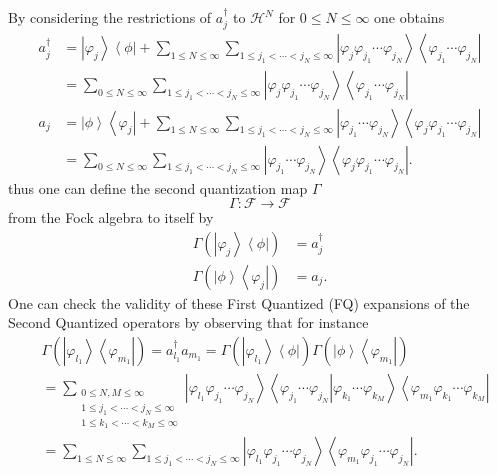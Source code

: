 \documentclass[aps,preprint]{revtex4}%
\begin{document}
\bigskip By considering the restrictions of $a_{j}^{\dagger}$ to
$\mathcal{H}^{N}$ for $0\leq N\leq\infty$ one obtains%
\begin{align}
a_{j}^{\dagger}  &  =\left\vert \varphi_{j}\right\rangle \left\langle
\phi\right\vert +\sum_{1\leq N\leq\infty}\sum_{1\leq j_{1}<\cdots<j_{N}%
\leq\infty}\left\vert \varphi_{j}\varphi_{j_{1}}\cdots\varphi_{j_{N}%
}\right\rangle \left\langle \varphi_{j_{1}}\cdots\varphi_{j_{N}}\right\vert
\nonumber\\
&  =\sum_{0\leq N\leq\infty}\sum_{1\leq j_{1}<\cdots<j_{N}\leq\infty
}\left\vert \varphi_{j}\varphi_{j_{1}}\cdots\varphi_{j_{N}}\right\rangle
\left\langle \varphi_{j_{1}}\cdots\varphi_{j_{N}}\right\vert \nonumber\\
a_{j}  &  =\left\vert \phi\right\rangle \left\langle \varphi_{j}\right\vert
+\sum_{1\leq N\leq\infty}\sum_{1\leq j_{1}<\cdots<j_{N}\leq\infty}\left\vert
\varphi_{j_{1}}\cdots\varphi_{j_{N}}\right\rangle \left\langle \varphi
_{j}\varphi_{j_{1}}\cdots\varphi_{j_{N}}\right\vert \nonumber\\
&  =\sum_{0\leq N\leq\infty}\sum_{1\leq j_{1}<\cdots<j_{N}\leq\infty
}\left\vert \varphi_{j_{1}}\cdots\varphi_{j_{N}}\right\rangle \left\langle
\varphi_{j}\varphi_{j_{1}}\cdots\varphi_{j_{N}}\right\vert . \label{FQ1}%
\end{align}
thus one can define the second quantization map $\Gamma$
\begin{equation}
\Gamma:\mathcal{F\rightarrow F}%
\end{equation}
from the Fock algebra to itself by
\begin{align}
\Gamma\left(  \left\vert \varphi_{j}\right\rangle \left\langle \phi\right\vert
\right)   &  =a_{j}^{\dagger}\nonumber\\
\Gamma\left(  \left\vert \phi\right\rangle \left\langle \varphi_{j}\right\vert
\right)   &  =a_{j}.
\end{align}
One can check the validity of these First Quantized (FQ) expansions of the
Second Quantized operators by observing that for instance%
\begin{align}
&  \Gamma\left(  \left\vert \varphi_{l_{1}}\right\rangle \left\langle
\varphi_{m_{1}}\right\vert \right)  =a_{l_{1}}^{\dagger}a_{m_{1}}%
=\Gamma\left(  \left\vert \varphi_{l_{1}}\right\rangle \left\langle
\phi\right\vert \right)  \Gamma\left(  \left\vert \phi\right\rangle
\left\langle \varphi_{m_{1}}\right\vert \right) \nonumber\\
&  =\sum_{\substack{0\leq N,M\leq\infty\\1\leq j_{1}<\cdots<j_{N}\leq
\infty\\1\leq k_{1}<\cdots<k_{M}\leq\infty}}\left\vert \varphi_{l_{1}}%
\varphi_{j_{1}}\cdots\varphi_{j_{N}}\right\rangle \left\langle \left.
\varphi_{j_{1}}\cdots\varphi_{j_{N}}\right\vert \varphi_{k_{1}}\cdots
\varphi_{k_{M}}\right\rangle \left\langle \varphi_{m_{1}}\varphi_{k_{1}}%
\cdots\varphi_{k_{M}}\right\vert \nonumber\\
&  =\sum_{1\leq N\leq\infty}\sum_{1\leq j_{1}<\cdots<j_{N}\leq\infty
}\left\vert \varphi_{l_{1}}\varphi_{j_{1}}\cdots\varphi_{j_{N}}\right\rangle
\left\langle \varphi_{m_{1}}\varphi_{j_{1}}\cdots\varphi_{j_{N}}\right\vert .
\end{align}
\end{document}
